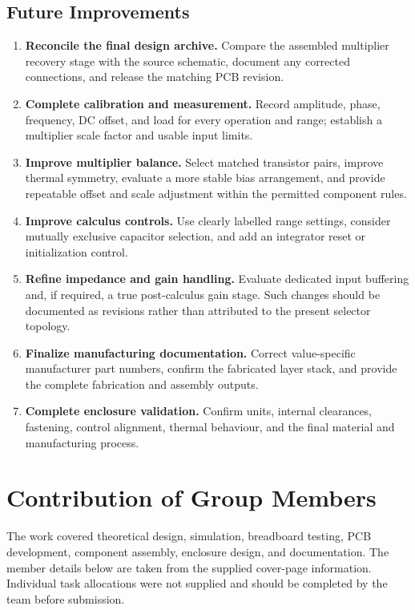 \documentclass[11pt,a4paper]{article}
\begin{document}
\subsection{Future Improvements}
\begin{enumerate}
\item \textbf{Reconcile the final design archive.} Compare the assembled multiplier recovery stage with the source schematic, document any corrected connections, and release the matching PCB revision.
\item \textbf{Complete calibration and measurement.} Record amplitude, phase, frequency, DC offset, and load for every operation and range; establish a multiplier scale factor and usable input limits.
\item \textbf{Improve multiplier balance.} Select matched transistor pairs, improve thermal symmetry, evaluate a more stable bias arrangement, and provide repeatable offset and scale adjustment within the permitted component rules.
\item \textbf{Improve calculus controls.} Use clearly labelled range settings, consider mutually exclusive capacitor selection, and add an integrator reset or initialization control.
\item \textbf{Refine impedance and gain handling.} Evaluate dedicated input buffering and, if required, a true post-calculus gain stage. Such changes should be documented as revisions rather than attributed to the present selector topology.
\item \textbf{Finalize manufacturing documentation.} Correct value-specific manufacturer part numbers, confirm the fabricated layer stack, and provide the complete fabrication and assembly outputs.
\item \textbf{Complete enclosure validation.} Confirm units, internal clearances, fastening, control alignment, thermal behaviour, and the final material and manufacturing process.
\end{enumerate}

\section{Contribution of Group Members}
The work covered theoretical design, simulation, breadboard testing, PCB development, component assembly, enclosure design, and documentation. The member details below are taken from the supplied cover-page information. Individual task allocations were not supplied and should be completed by the team before submission.
\end{document}
